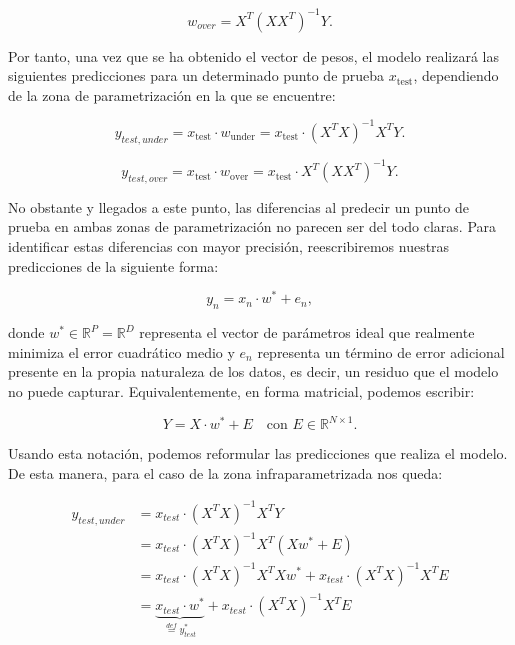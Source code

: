 \begin{equation}
    w_{over} = X^{T}{(XX^{T})}^{-1}Y.
\end{equation}

Por tanto, una vez que se ha obtenido el vector de pesos, el modelo realizará las siguientes predicciones para un determinado punto de prueba $x_{\text{test}}$, dependiendo de la zona de parametrización en la que se encuentre:

\begin{equation}
    y_{test, under} = x_{\text{test}} \cdot w_{\text{under}} = x_{\text{test}} \cdot {(X^{T}X)}^{-1}X^{T}Y.
\end{equation}

\begin{equation}
    y_{test, over} = x_{\text{test}} \cdot w_{\text{over}} = x_{\text{test}} \cdot X^{T}{(XX^{T})}^{-1}Y.
\end{equation}

No obstante y llegados a este punto, las diferencias al predecir un punto de prueba en ambas zonas de parametrización no parecen ser del todo claras. Para identificar estas diferencias con mayor precisión, reescribiremos nuestras predicciones de la siguiente forma:

\[
    y_n = x_n \cdot w^{*} + e_n,
\]

donde $w^{*} \in \mathbb{R}^{P} = \mathbb{R}^{D}$ representa el vector de parámetros ideal que realmente minimiza el error cuadrático medio y $e_n$ representa un término de error adicional presente en la propia naturaleza de los datos, es decir, un residuo que el modelo no puede capturar. Equivalentemente, en forma matricial, podemos escribir:

\[
    Y = X \cdot w^{*} + E \quad \text{con } E \in \mathbb{R}^{N \times 1}.
\]

Usando esta notación, podemos reformular las predicciones que realiza el modelo. De esta manera, para el caso de la zona infraparametrizada nos queda:

\begin{align}
    y_{test, under} &= x_{test} \cdot {(X^T X)}^{-1} X^T Y \\
    &= x_{test} \cdot {(X^T X)}^{-1} X^T (X w^{*} + E) \\
    &= x_{test} \cdot {(X^T X)}^{-1} X^T X w^{*} + x_{test} \cdot {(X^T X)}^{-1} X^T E \\
    &= \underbrace{x_{test} \cdot w^{*}}_{\overset{def}{=} y^*_{test}} + x_{test} \cdot {(X^T X)}^{-1} X^T E
\end{align}

